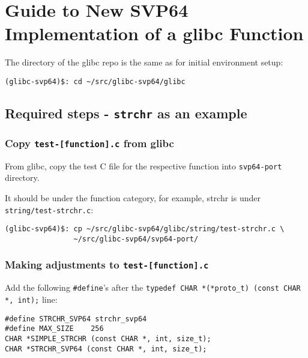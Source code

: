 %

\chapter{Guide to New SVP64 Implementation of a glibc Function}
\label{sec:adding_new_func}

The directory of the glibc repo is the same as for initial environment setup:

\begin{verbatim}
(glibc-svp64)$: cd ~/src/glibc-svp64/glibc
\end{verbatim}

\section{Required steps - \texttt{strchr} as an example}

\subsection{Copy \texttt{test-[function].c} from glibc}

From glibc, copy the test C file for the respective function
into \texttt{svp64-port} directory.

It should be under the function category, for example, strchr is
under \texttt{string/test-strchr.c}:

\begin{verbatim}
(glibc-svp64)$: cp ~/src/glibc-svp64/glibc/string/test-strchr.c \
                ~/src/glibc-svp64/svp64-port/
\end{verbatim}

\subsection{Making adjustments to \texttt{test-[function].c}}

Add the following \texttt{\#define}'s after the
\texttt{typedef CHAR *(*proto\_t) (const CHAR *, int);} line:

\begin{verbatim}
#define STRCHR_SVP64 strchr_svp64
#define MAX_SIZE    256
CHAR *SIMPLE_STRCHR (const CHAR *, int, size_t);
CHAR *STRCHR_SVP64 (const CHAR *, int, size_t);
\end{verbatim}

